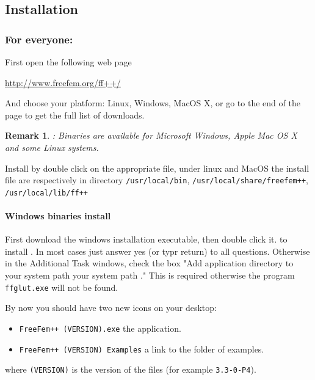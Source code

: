 \documentclass[a4paper,twoside,12pt]{book}
\newtheorem{remark}{Remark}
\begin{document}
\subsection{Installation}
\subsubsection{For everyone:}
 First open the following web page
 \begin{center}
  \url{http://www.freefem.org/ff++/}
 \end{center}

And choose your platform: Linux, Windows, MacOS X,
or go to the end of the page to get the full list of downloads.

\begin{remark}: Binaries are available for Microsoft Windows, Apple
Mac OS X and some Linux systems.
\end{remark}
Install by double click on the appropriate file, under linux and MacOS the
install file are respectively in directory  \texttt{/usr/local/bin},  \texttt{/usr/local/share/freefem++},  \texttt{/usr/local/lib/ff++}


\paragraph{Windows binaries install}

  First download the windows installation executable, then double click it. to install \freefempp. In most cases just answer yes (or typr return) to all questions. Otherwise in the Additional Task windows, check the  box "Add application directory to your system path your system path ." This is required otherwise the program  \texttt{ffglut.exe} will not be found.

  By now you should have
  two new icons on your desktop:
  \begin{itemize}
   \item \texttt{FreeFem++ (VERSION).exe}  the  \freefempp application.
   \item \texttt{FreeFem++ (VERSION) Examples} a link to the \freefempp  folder of  examples.
  \end{itemize}
  where \texttt{(VERSION)} is the version of the files (for example \texttt{3.3-0-P4}).
\end{document}
